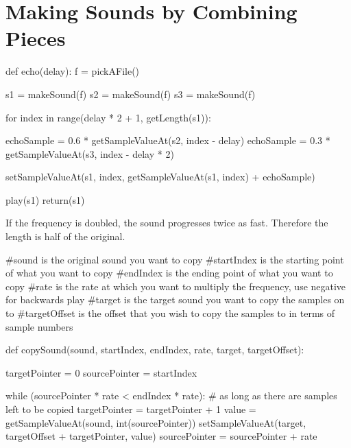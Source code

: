 \chapter[Combining Sounds]{Making Sounds by Combining Pieces}

\begin{exercises}

\begin{ex}
\begin{example}
def echo(delay):
  f = pickAFile()

  s1 = makeSound(f)
  s2 = makeSound(f)
  s3 = makeSound(f)

  for index in range(delay * 2 + 1, getLength(s1)):

    echoSample = 0.6 * getSampleValueAt(s2, index - delay)
    echoSample = 0.3 * getSampleValueAt(s3, index - delay * 2)

    setSampleValueAt(s1, index, getSampleValueAt(s1, index) + echoSample)

  play(s1)
  return(s1)
\end{example}
\end{ex}

\begin{ex}
If the frequency is doubled, the sound progresses twice as fast. Therefore
the length is half of the original.
\end{ex}

\begin{ex}
\begin{example}
#sound is the original sound you want to copy
#startIndex is the starting point of what you want to copy
#endIndex is the ending point of what you want to copy
#rate is the rate at which you want to multiply the frequency, use negative
for backwards play
#target is the target sound you want to copy the samples on to
#targetOffset is the offset that you wish to copy the samples to in terms
of sample numbers

def copySound(sound, startIndex, endIndex, rate, target, targetOffset):

  targetPointer = 0
  sourcePointer = startIndex

  while (sourcePointer * rate < endIndex * rate): # as long as there are
samples left to be copied
    targetPointer = targetPointer + 1
    value = getSampleValueAt(sound, int(sourcePointer))
    setSampleValueAt(target, targetOffset + targetPointer, value)
    sourcePointer = sourcePointer + rate


\end{example}
\end{ex}
\end{exercises}
